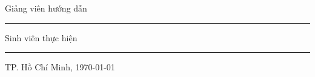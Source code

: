 {\begin{titlepage}
    \vspace{11mm}
    \begingroup
      \setlength{\fboxsep}{6mm}
      \colorbox{#6!7}{%
        \begin{minipage}{\dimexpr0.78\textwidth-12mm\relax}
          \begin{minipage}[t]{0.34\linewidth}
            \vspace{0pt}
            {\small\bfseries\color{#6}\raggedright
              Giảng viên hướng dẫn\par}
          \end{minipage}%
          \hfill
          \begin{minipage}[t]{0.60\linewidth}
            \vspace{0pt}
            {\normalsize\raggedright
              \teachername\par}
          \end{minipage}

          \vspace{3mm}
          {\color{#6!35}\rule{\linewidth}{0.45pt}\par}
          \vspace{3mm}

          \begin{minipage}[t]{0.34\linewidth}
            \vspace{0pt}
            {\small\bfseries\color{#6}\raggedright
              Sinh viên thực hiện\par}
          \end{minipage}%
          \hfill
          \begin{minipage}[t]{0.60\linewidth}
            \vspace{0pt}
            {\normalsize\raggedright
              \studentname\par}
          \end{minipage}
        \end{minipage}%
      }
    \endgroup

    \vfill
    {\color{#6}\rule{28mm}{0.8pt}\par}
    \vspace{3mm}
    {\small TP. Hồ Chí Minh, \today\par}
  \end{titlepage}%
}
